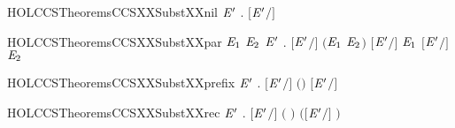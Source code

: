 \newcommand{\HOLCCSTheoremsCCSXXSubstXXIMPXXNOTINXXFV}{\UseVerbatim{HOLCCSTheoremsCCSXXSubstXXIMPXXNOTINXXFV}}
\begin{SaveVerbatim}{HOLCCSTheoremsCCSXXSubstXXnil}
\HOLTokenTurnstile{} \HOLSymConst{\HOLTokenForall{}}\ensuremath{\HOLBoundVar{E}\sp{\prime}} . \ensuremath{[}\ensuremath{\HOLBoundVar{E}\sp{\prime}}\ensuremath{/}\ensuremath{]}  \HOLSymConst{\ensuremath{=}} 
\end{SaveVerbatim}
\newcommand{\HOLCCSTheoremsCCSXXSubstXXnil}{\UseVerbatim{HOLCCSTheoremsCCSXXSubstXXnil}}
\begin{SaveVerbatim}{HOLCCSTheoremsCCSXXSubstXXpar}
\HOLTokenTurnstile{} \HOLSymConst{\HOLTokenForall{}}\ensuremath{\HOLBoundVar{E}\sb{\mathrm{1}}} \ensuremath{\HOLBoundVar{E}\sb{\mathrm{2}}} \ensuremath{\HOLBoundVar{E}\sp{\prime}} . \ensuremath{[}\ensuremath{\HOLBoundVar{E}\sp{\prime}}\ensuremath{/}\ensuremath{]} \ensuremath{(}\ensuremath{\HOLBoundVar{E}\sb{\mathrm{1}}} \HOLSymConst{\ensuremath{\mid}} \ensuremath{\HOLBoundVar{E}\sb{\mathrm{2}}}\ensuremath{)} \HOLSymConst{\ensuremath{=}} \ensuremath{[}\ensuremath{\HOLBoundVar{E}\sp{\prime}}\ensuremath{/}\ensuremath{]} \ensuremath{\HOLBoundVar{E}\sb{\mathrm{1}}} \HOLSymConst{\ensuremath{\mid}} \ensuremath{[}\ensuremath{\HOLBoundVar{E}\sp{\prime}}\ensuremath{/}\ensuremath{]} \ensuremath{\HOLBoundVar{E}\sb{\mathrm{2}}}
\end{SaveVerbatim}
\newcommand{\HOLCCSTheoremsCCSXXSubstXXpar}{\UseVerbatim{HOLCCSTheoremsCCSXXSubstXXpar}}
\begin{SaveVerbatim}{HOLCCSTheoremsCCSXXSubstXXprefix}
\HOLTokenTurnstile{} \HOLSymConst{\HOLTokenForall{}}  \ensuremath{\HOLBoundVar{E}\sp{\prime}} . \ensuremath{[}\ensuremath{\HOLBoundVar{E}\sp{\prime}}\ensuremath{/}\ensuremath{]} \ensuremath{(}\HOLSymConst{\ensuremath{\ldotp}}\ensuremath{)} \HOLSymConst{\ensuremath{=}} \HOLSymConst{\ensuremath{\ldotp}}\ensuremath{[}\ensuremath{\HOLBoundVar{E}\sp{\prime}}\ensuremath{/}\ensuremath{]} 
\end{SaveVerbatim}
\newcommand{\HOLCCSTheoremsCCSXXSubstXXprefix}{\UseVerbatim{HOLCCSTheoremsCCSXXSubstXXprefix}}
\begin{SaveVerbatim}{HOLCCSTheoremsCCSXXSubstXXrec}
\HOLTokenTurnstile{} \HOLSymConst{\HOLTokenForall{}}  \ensuremath{\HOLBoundVar{E}\sp{\prime}} .
       \ensuremath{[}\ensuremath{\HOLBoundVar{E}\sp{\prime}}\ensuremath{/}\ensuremath{]} \ensuremath{(}  \ensuremath{)} \HOLSymConst{\ensuremath{=}}
         \HOLSymConst{\ensuremath{=}}         \ensuremath{(}\ensuremath{[}\ensuremath{\HOLBoundVar{E}\sp{\prime}}\ensuremath{/}\ensuremath{]} \ensuremath{)}
\end{SaveVerbatim}
